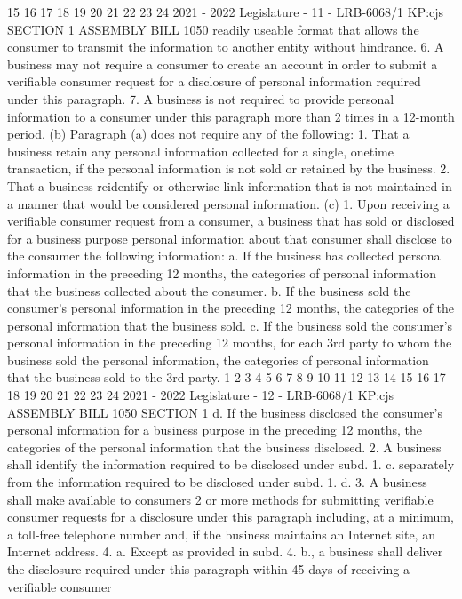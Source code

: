 15
16
17
18
19
20
21
22
23
24
2021 - 2022 Legislature - 11 - LRB-6068/1
KP:cjs
SECTION 1 ASSEMBLY BILL 1050
readily useable format that allows the consumer to transmit the information to
another entity without hindrance.
6. A business may not require a consumer to create an account in order to
submit a verifiable consumer request for a disclosure of personal information
required under this paragraph.
7. A business is not required to provide personal information to a consumer
under this paragraph more than 2 times in a 12-month period.
(b) Paragraph (a) does not require any of the following:
1. That a business retain any personal information collected for a single,
onetime transaction, if the personal information is not sold or retained by the
business.
2. That a business reidentify or otherwise link information that is not
maintained in a manner that would be considered personal information.
(c) 1. Upon receiving a verifiable consumer request from a consumer, a business
that has sold or disclosed for a business purpose personal information about that
consumer shall disclose to the consumer the following information:
a. If the business has collected personal information in the preceding 12
months, the categories of personal information that the business collected about the
consumer.
b. If the business sold the consumer's personal information in the preceding 12
months, the categories of the personal information that the business sold.
c. If the business sold the consumer's personal information in the preceding 12
months, for each 3rd party to whom the business sold the personal information, the
categories of personal information that the business sold to the 3rd party.
1
2
3
4
5
6
7
8
9
10
11
12
13
14
15
16
17
18
19
20
21
22
23
24
2021 - 2022 Legislature - 12 - LRB-6068/1
KP:cjs
 ASSEMBLY BILL 1050 SECTION 1
d. If the business disclosed the consumer's personal information for a business
purpose in the preceding 12 months, the categories of the personal information that
the business disclosed.
2. A business shall identify the information required to be disclosed under
subd. 1. c. separately from the information required to be disclosed under subd. 1. d.
3. A business shall make available to consumers 2 or more methods for
submitting verifiable consumer requests for a disclosure under this paragraph
including, at a minimum, a toll-free telephone number and, if the business
maintains an Internet site, an Internet address.
4. a. Except as provided in subd. 4. b., a business shall deliver the disclosure
required under this paragraph within 45 days of receiving a verifiable consumer
